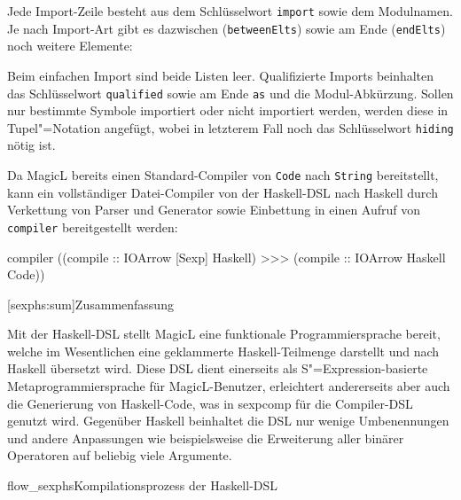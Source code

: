 \documentclass[12pt, a4paper, bibgerm]{scrbook}
\newenvironment{DIFnomarkup}{}{}
\newcommand\icode[1]{\lstinline?#1?}
\newcommand\lsection{}
\newcommand\cref{}
\newcommand\fig{}
\newcommand{\sexp}{S"=Expression}
\begin{document}
Jede Import-Zeile besteht aus dem Schlüsselwort \icode{import} sowie
dem Modulnamen. Je nach Import-Art gibt es dazwischen
(\icode{betweenElts}) sowie am Ende (\icode{endElts}) noch
weitere Elemente:
\begin{DIFnomarkup}\end{DIFnomarkup}%
Beim einfachen Import sind beide Listen leer. Qualifizierte Imports
beinhalten das Schlüsselwort \icode{qualified} sowie am Ende
\icode{as} und die Modul-Abkürzung. Sollen nur bestimmte Symbole
importiert oder nicht importiert werden, werden diese in
Tupel"=Notation angefügt, wobei in letzterem Fall noch das
Schlüsselwort \icode{hiding} nötig ist.

Da MagicL bereits einen Standard-Compiler von \icode{Code} nach
\icode{String} bereitstellt, kann ein vollständiger Datei-Compiler von
der Haskell-DSL nach Haskell durch Verkettung von Parser
und Generator sowie Einbettung in einen Aufruf von \icode{compiler}
bereitgestellt werden:
\begin{DIFnomarkup}\begin{code}
compiler ((compile :: IOArrow [Sexp] Haskell) >>> 
          (compile :: IOArrow Haskell Code))  
\end{code}\end{DIFnomarkup}

\lsection[sexphs:sum]{Zusammenfassung}

Mit der Haskell-DSL stellt MagicL eine funktionale Programmiersprache
bereit, welche im Wesentlichen eine geklammerte Haskell-Teilmenge
darstellt und nach Haskell übersetzt wird. Diese DSL dient einerseits
als \sexp{}-basierte Metaprogrammiersprache für MagicL-Benutzer,
erleichtert andererseits aber auch die Generierung von Haskell-Code, was
in \cref{sexpcomp} für die Compiler-DSL genutzt wird. Gegenüber Haskell
beinhaltet die DSL nur wenige Umbenennungen und andere Anpassungen wie
beispielsweise die Erweiterung aller binärer Operatoren auf beliebig
viele Argumente.

\fig{flow_sexphs}{Kompilationsprozess der Haskell-DSL}
\end{document}
